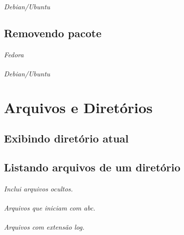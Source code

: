 \documentclass[a4paper,9pt]{extarticle}
\begin{document}
\begin{multicols}{2}
	\paragraph{} \emph{Debian/Ubuntu}
	
\subsection{Removendo pacote}
	\paragraph{} \emph{Fedora}
	
	\paragraph{} \emph{Debian/Ubuntu}
\section{Arquivos e Diretórios}
\subsection{Exibindo diretório atual}

	
\subsection{Listando arquivos de um diretório}
	
	\paragraph{}
	\paragraph{} \emph{Inclui arquivos ocultos.}
	\paragraph{} \emph{Arquivos que iniciam com abc.}
	\paragraph{} \emph{Arquivos com extensão log.}
	

\end{multicols}
\end{document}
